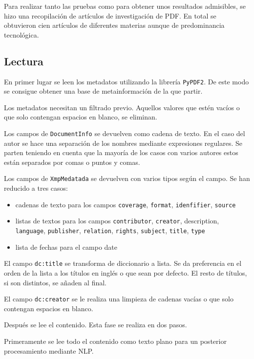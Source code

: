 \documentclass[../main.tex]{subfiles}
\begin{document}
Para realizar tanto las pruebas como para obtener unos resultados admisibles, se hizo una recopilación de artículos de investigación de PDF. En total se obtuvieron cien artículos de diferentes materias aunque de predominancia tecnológica.


\subsection{Lectura}

En primer lugar se leen los metadatos utilizando la librería \texttt{PyPDF2}. De este modo se consigue obtener una base de metainformación de la que partir.

Los metadatos necesitan un filtrado previo. Aquellos valores que estén vacíos o que solo contengan espacios en blanco, se eliminan.

Los campos de \texttt{DocumentInfo} se devuelven como cadena de texto. En el caso del autor se hace una separación de los nombres mediante expresiones regulares. Se parten teniendo en cuenta que la mayoría de los casos con varios autores estos están separados por comas o puntos y comas.

Los campos de \texttt{XmpMedatada} se devuelven con varios tipos según el campo. Se han reducido a tres casos:

\begin{itemize}
	\item cadenas de texto para los campos \texttt{coverage}, \texttt{format}, \texttt{idenfifier}, \texttt{source}
	\item listas de textos para los campos \texttt{contributor}, \texttt{creator}, description, \texttt{language}, \texttt{publisher}, \texttt{relation}, \texttt{rights}, \texttt{subject}, \texttt{title}, \texttt{type}
	\item lista de fechas para el campo date
\end{itemize}

El campo \texttt{dc:title} se transforma de diccionario a lista. Se da preferencia en el orden de la lista a los títulos en inglés o que sean por defecto. El resto de títulos, si son distintos, se añaden al final.

El campo \texttt{dc:creator} se le realiza una limpieza de cadenas vacías o que solo contengan espacios en blanco.

Después se lee el contenido. Esta fase se realiza en dos pasos.

Primeramente se lee todo el contenido como texto plano para un posterior procesamiento mediante NLP.
\end{document}
